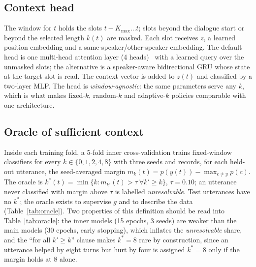 \documentclass[journal]{IEEEtran}
\begin{document}
\subsection{Context head}
The window for $t$ holds the slots $t-K_{\max} \ldots t$; slots beyond the dialogue start or beyond the selected length $k(t)$ are masked. Each slot receives $z$, a learned position embedding and a same-speaker/other-speaker embedding. The default head is one multi-head attention layer (4 heads)~\cite{vaswani2017attention} with a learned query over the unmasked slots; the alternative is a speaker-aware bidirectional GRU whose state at the target slot is read. The context vector is added to $z(t)$ and classified by a two-layer MLP. The head is \emph{window-agnostic}: the same parameters serve any $k$, which is what makes fixed-$k$, random-$k$ and adaptive-$k$ policies comparable with one architecture.

\subsection{Oracle of sufficient context}\label{sec:oracle}
Inside each training fold, a 5-fold inner cross-validation trains fixed-window classifiers for every $k \in \{0, 1, 2, 4, 8\}$ with three seeds and records, for each held-out utterance, the seed-averaged margin $m_k(t) = p(y(t)) - \max_{c \neq y} p(c)$. The oracle is $k^*(t) = \min\{k : m_{k'}(t) > \tau \ \forall k' \geq k\}$, $\tau = 0.10$; an utterance never classified with margin above $\tau$ is labelled \emph{unresolvable}. Test utterances have no $k^*$; the oracle exists to supervise $g$ and to describe the data (Table~\ref{tab:oracle}). Two properties of this definition should be read into Table~\ref{tab:oracle}: the inner models (15 epochs, 3 seeds) are weaker than the main models (30 epochs, early stopping), which inflates the \emph{unresolvable} share, and the ``for all $k' \geq k$'' clause makes $k^* = 8$ rare by construction, since an utterance helped by eight turns but hurt by four is assigned $k^* = 8$ only if the margin holds at 8 alone.
\end{document}
